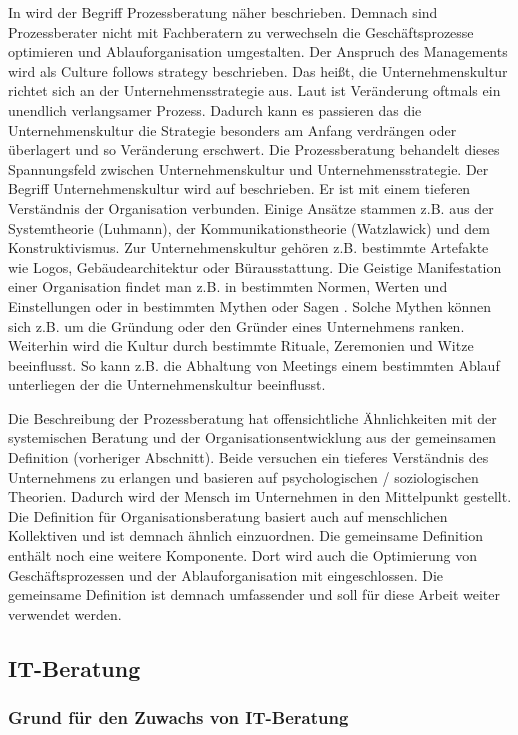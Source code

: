 In \cite[9]{HBProzess} wird der Begriff Prozessberatung näher beschrieben. Demnach sind Prozessberater nicht mit Fachberatern zu verwechseln die Geschäftsprozesse optimieren und Ablauforganisation umgestalten. Der Anspruch des Managements wird als \glqq Culture follows strategy \grqq beschrieben. Das heißt, die Unternehmenskultur richtet sich an der Unternehmensstrategie aus. Laut \cite[9]{HBProzess} ist Veränderung oftmals ein unendlich verlangsamer Prozess. Dadurch kann es passieren das die Unternehmenskultur die Strategie besonders am Anfang verdrängen oder überlagert und so Veränderung erschwert. Die Prozessberatung behandelt dieses Spannungsfeld zwischen Unternehmenskultur und Unternehmensstrategie.
Der Begriff Unternehmenskultur wird auf \cite[ Seite 9]{HBProzess} beschrieben. Er ist mit einem tieferen Verständnis der Organisation verbunden. Einige
Ansätze stammen z.B. aus der Systemtheorie (Luhmann), der Kommunikationstheorie (Watzlawick) und dem Konstruktivismus. Zur Unternehmenskultur gehören z.B. bestimmte Artefakte wie Logos, Gebäudearchitektur oder Bürausstattung. Die Geistige Manifestation einer Organisation findet man z.B. in bestimmten Normen, Werten und Einstellungen oder in bestimmten \glqq Mythen oder Sagen \grqq. Solche Mythen können sich z.B. um die Gründung oder den Gründer eines Unternehmens ranken. Weiterhin wird die Kultur durch bestimmte Rituale, Zeremonien und Witze beeinflusst. So kann z.B. die Abhaltung von Meetings einem bestimmten Ablauf unterliegen der die Unternehmenskultur beeinflusst.

Die Beschreibung der Prozessberatung hat offensichtliche Ähnlichkeiten mit der systemischen Beratung und der Organisationsentwicklung aus der gemeinsamen Definition (vorheriger Abschnitt). Beide versuchen ein tieferes Verständnis des Unternehmens zu erlangen und basieren auf psychologischen / soziologischen Theorien. Dadurch wird der Mensch im Unternehmen in den Mittelpunkt gestellt.
Die Definition für Organisationsberatung basiert auch auf \grqq menschlichen Kollektiven \glqq und ist demnach ähnlich einzuordnen.
Die gemeinsame Definition enthält noch eine weitere Komponente. Dort wird auch die Optimierung von Geschäftsprozessen und der Ablauforganisation mit eingeschlossen. Die gemeinsame Definition ist demnach umfassender und soll für diese Arbeit weiter verwendet werden. 


\subsection{IT-Beratung}
	\subsubsection{Grund für den Zuwachs von IT-Beratung}
	
